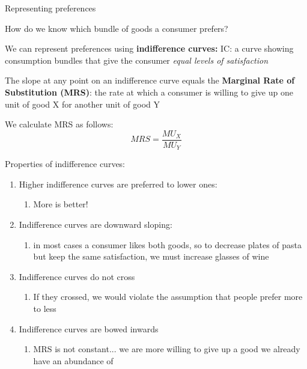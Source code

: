\documentclass[compress]{beamer}
\begin{document}
\begin{frame}{Representing preferences}
\begin{center}
    How do we know which bundle of goods a consumer prefers?
\end{center}
    \begin{block}{We can represent preferences using \textbf{indifference curves:}}
IC: a curve showing consumption bundles that give the consumer \textit{equal levels of satisfaction}

\vspace{3mm}

The slope at any point on an indifference curve equals the \textbf{Marginal Rate of Substitution (MRS)}: the rate at which a consumer is willing to give up one unit of good X for another unit of good Y
    \end{block}

    \vspace{2mm}

    We calculate MRS as follows:
    \[MRS = \frac{MU_X}{MU_Y}\]
\end{frame}

\begin{frame}{Properties of indifference curves:}
    \begin{enumerate}
        \item Higher indifference curves are preferred to lower ones: 
        \begin{enumerate}
            \item More is better!
        \end{enumerate}
        \item Indifference curves are downward sloping: 
        \begin{enumerate}
            \item in most cases a consumer likes both goods, so to decrease plates of pasta but keep the same satisfaction, we must increase glasses of wine
        \end{enumerate}
    \item Indifference curves do not cross
    \begin{enumerate}
        \item If they crossed, we would violate the assumption that people prefer more to less
    \end{enumerate}
    \item Indifference curves are bowed inwards
    \begin{enumerate}
        \item MRS is not constant... we are more willing to give up a good we already have an abundance of
    \end{enumerate}
    \end{enumerate}
\end{frame}
\end{document}
